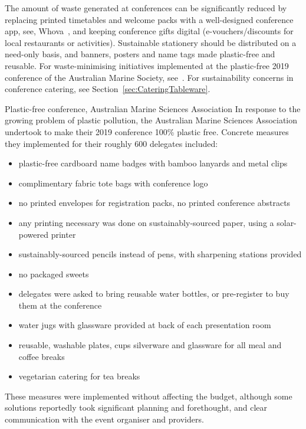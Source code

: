 \documentclass[../SustainableHEP.tex]{subfiles}
\begin{document}
The amount of waste generated at conferences can be significantly reduced by replacing printed timetables and welcome packs with a well-designed conference app, see, \eg Whova~\cite{Whova}, and keeping conference gifts digital (\eg e-vouchers/discounts for local restaurants or activities).    Sustainable stationery should be distributed on a need-only basis, and banners, posters and name tags made plastic-free and reusable.  For waste-minimising initiatives implemented at the plastic-free 2019 conference of the Australian Marine Society, see~.  For sustainability concerns in conference catering, see Section~\ref{sec:CateringTableware}.


\begin{bestpractice}{Plastic-free conference, Australian Marine Sciences Association}%
\noindent In response to the growing problem of plastic pollution, the Australian Marine Sciences Association undertook to make their 2019 conference 100\% plastic free. Concrete measures they implemented for their roughly 600 delegates included:
    \begin{itemize}
        \item plastic-free cardboard name badges with bamboo lanyards and metal clips
        \item complimentary fabric tote bags with conference logo
        \item no printed envelopes for registration packs, no printed conference abstracts
        \item any printing necessary was done on sustainably-sourced paper, using a solar-powered printer
        \item sustainably-sourced pencils instead of pens, with sharpening stations provided
        \item no packaged sweets
        \item delegates were asked to bring reusable water bottles, or pre-register to buy them at the conference
        \item water jugs with glassware provided at back of each presentation room
        \item reusable, washable plates, cups silverware and glassware for all meal and coffee breaks
        \item vegetarian catering for tea breaks
    \end{itemize}
    These measures were implemented without affecting the budget, although some solutions reportedly took significant planning and forethought, and clear communication with the event organiser and providers.
\end{bestpractice}
\end{document}
